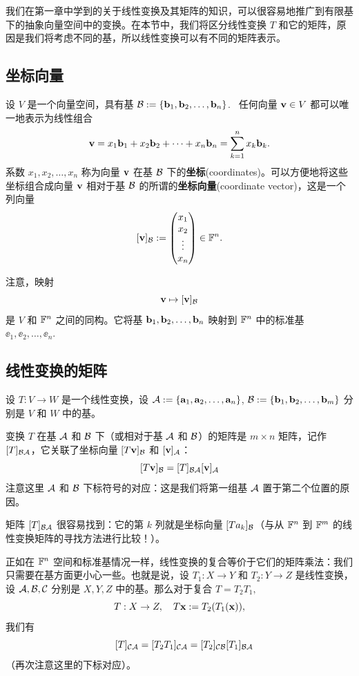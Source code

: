 我们在第一章中学到的关于线性变换及其矩阵的知识，可以很容易地推广到有限基下的抽象向量空间中的变换。在本节中，我们将区分线性变换 $T$ 和它的矩阵，原因是我们将考虑不同的基，所以线性变换可以有不同的矩阵表示。

\subsection{坐标向量}\label{sec:02-08-01}

设 $V$ 是一个向量空间，具有基 $\mathcal{B} := \{\mathbf{b}_1, \mathbf{b}_2, \dots, \mathbf{b}_n\}$. ~任何向量 $\mathbf{v} \in V$ 都可以唯一地表示为线性组合
$$
\mathbf{v} = x_1 \mathbf{b}_1 + x_2 \mathbf{b}_2 + \dots + x_n \mathbf{b}_n = \sum_{k=1}^n x_k \mathbf{b}_k.
$$
系数 $x_1, x_2, \dots, x_n$ 称为向量 $\mathbf{v}$ 在基 $\mathcal{B}$ 下的\textbf{坐标}(coordinates)。可以方便地将这些坐标组合成向量 $\mathbf{v}$ 相对于基 $\mathcal{B}$ 的所谓的\textbf{坐标向量}(coordinate vector)，这是一个列向量
$$[\mathbf{v}]_{\mathcal{B}} := \begin{pmatrix} x_1 \\ x_2 \\ \vdots \\ x_n \end{pmatrix} \in \mathbb{F}^n.$$

注意，映射 $$\mathbf{v} \mapsto [\mathbf{v}]_{\mathcal{B}}$$
是 $V$ 和 $\mathbb{F}^n$ 之间的同构。它将基 $\mathbf{b}_1, \mathbf{b}_2, \dots, \mathbf{b}_n$ 映射到 $\mathbb{F}^n$ 中的标准基 $\ee_1, \ee_2, \dots, \ee_n$. ~

\subsection{线性变换的矩阵}\label{sec:02-08-02}

设 $T: V \to W$ 是一个线性变换，设 $\mathcal{A} := \{\mathbf{a}_1, \mathbf{a}_2, \dots, \mathbf{a}_n\}$, $\mathcal{B} := \{\mathbf{b}_1, \mathbf{b}_2, \dots, \mathbf{b}_m\}$ 分别是 $V$ 和 $W$ 中的基。

变换 $T$ 在基 $\mathcal{A}$ 和 $\mathcal{B}$ 下（或相对于基 $\mathcal{A}$ 和 $\mathcal{B}$）的矩阵是 $m \times n$ 矩阵，记作 $[T]_{\mathcal{B}\mathcal{A}}$，它关联了坐标向量 $[T \mathbf{v}]_{\mathcal{B}}$ 和 $[\mathbf{v}]_{\mathcal{A}}$：
$$
[T \mathbf{v}]_{\mathcal{B}} = [T]_{\mathcal{B}\mathcal{A}} [\mathbf{v}]_{\mathcal{A}}
$$
注意这里 $\mathcal{A}$ 和 $\mathcal{B}$ 下标符号的对应：这是我们将第一组基 $\mathcal{A}$ 置于第二个位置的原因。

矩阵 $[T]_{\mathcal{B}\mathcal{A}}$ 很容易找到：它的第 $k$ 列就是坐标向量 $[T a_k]_{\mathcal{B}}$（与从 $\mathbb{F}^n$ 到 $\mathbb{F}^m$ 的线性变换矩阵的寻找方法进行比较！）。

正如在 $\mathbb{F}^n$ 空间和标准基情况一样，线性变换的复合等价于它们的矩阵乘法：我们只需要在基方面更小心一些。也就是说，设 $T_1: X \to Y$ 和 $T_2: Y \to Z$ 是线性变换，设 $\mathcal{A}, \mathcal{B}, \mathcal{C}$ 分别是 $X, Y, Z$ 中的基。那么对于复合 $T = T_2 T_1,$
$$T: X \to Z, \quad T \mathbf{x} := T_2(T_1(\mathbf{x})),$$
我们有
\begin{equation}\label{eq:02-08-01}
\quad [T]_{\mathcal{C}\mathcal{A}} = [T_2 T_1]_{\mathcal{C}\mathcal{A}} = [T_2]_{\mathcal{C}\mathcal{B}} [T_1]_{\mathcal{B}\mathcal{A}}
\end{equation}
（再次注意这里的下标对应）。

